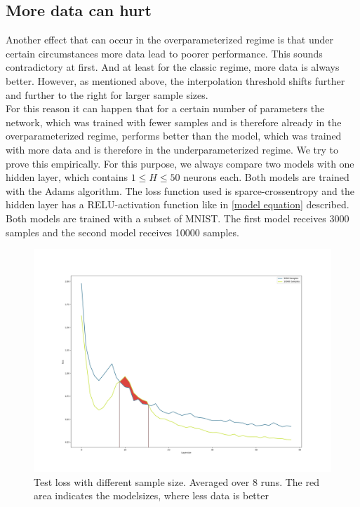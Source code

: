 \subsection{More data can hurt}
Another effect that can occur in the overparameterized regime is that under certain circumstances more data lead to poorer performance. This sounds contradictory at first. And at least for the classic regime, more data is always better. However, as mentioned above, the interpolation threshold shifts further and further to the right for larger sample sizes.\\
For this reason it can happen that for a certain number of parameters the network, which was trained with fewer samples and is therefore already in the overparameterized regime, performs better than the model, which was trained with more data and is therefore in the underparameterized regime. We try to prove this empirically. For this purpose, we always compare two models with one hidden layer, which contains $1 \leq H \leq 50$ neurons each. Both models are trained with the Adams algorithm. The loss function used is sparce-crossentropy and the hidden layer has a RELU-activation function like in \ref{model equation} described. Both models are trained with a subset of MNIST. The first model receives 3000 samples and the second model receives 10000 samples. \\

\begin{figure}[!htp]
\centering
\includegraphics[width= 1\linewidth]{Abschlussarbeit_2021/LaTeX/images/more_is_less.png}
\caption{ Test loss with different sample size. Averaged over 8 runs. The red area indicates the modelsizes, where less data is better}
\label{fig:more_data_hurt}
\end{figure}



